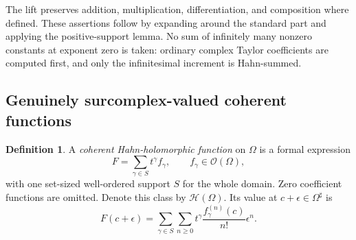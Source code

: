 \documentclass[11pt,a4paper]{article}
\numberwithin{equation}{section}
\theoremstyle{definition}
\newtheorem{definition}[theorem]{Definition}
\theoremstyle{remark}
\newcommand{\OO}{\mathcal O}
\newcommand{\HH}{\mathscr H}
\begin{document}
The lift preserves addition, multiplication, differentiation, and composition where defined. These assertions follow by expanding around the standard part and applying the positive-support lemma. No sum of infinitely many nonzero constants at exponent zero is taken: ordinary complex Taylor coefficients are computed first, and only the infinitesimal increment is Hahn-summed.

\subsection{Genuinely surcomplex-valued coherent functions}
\begin{definition}
A \emph{coherent Hahn-holomorphic function} on $\Omega$ is a formal expression
\begin{equation}
\label{eq:coherent}
 F=\sum_{\gamma\in S}t^\gamma f_\gamma,
 \qquad f_\gamma\in\OO(\Omega),
\end{equation}
with one set-sized well-ordered support $S$ for the whole domain. Zero coefficient functions are omitted. Denote this class by $\HH(\Omega)$. Its value at $c+\epsilon\in\Omega^\sharp$ is
\begin{equation}
\label{eq:coheval}
 F(c+\epsilon)=
 \sum_{\gamma\in S}\sum_{n\geq0}
 t^\gamma\frac{f_\gamma^{(n)}(c)}{n!}\epsilon^n.
\end{equation}
\end{definition}
\end{document}
